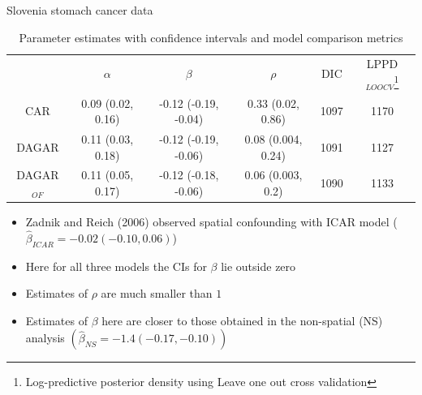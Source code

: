 \begin{frame}{Slovenia stomach cancer data}
	\begin{table}[!h]
		\begin{tiny}
			\caption{Parameter estimates with confidence intervals and model comparison metrics}\label{tab:slov}
			\begin{tabular}{cccccc}
				& $\alpha$ & $\beta$ & $\rho$ & DIC & LPPD$_{LOOCV}$\footnote{Log-predictive posterior density using Leave one out cross validation} \\
				CAR & 0.09 (0.02, 0.16) & -0.12 (-0.19, -0.04) & 0.33 (0.02, 0.86) & 1097 & 1170 \\
				DAGAR & 0.11 (0.03, 0.18) & -0.12 (-0.19, -0.06) & 0.08 (0.004, 0.24) & 1091 & 1127 \\
				DAGAR$_{OF}$ & 0.11 (0.05, 0.17) & -0.12 (-0.18, -0.06) & 0.06 (0.003, 0.2) & 1090 & 1133 \\
			\end{tabular}
		\end{tiny}
	\end{table}
	\begin{itemize}
		\item Zadnik and Reich (2006) observed \alert{spatial confounding} with ICAR model ($\hat\beta_{ICAR} = -0.02 (-0.10, 0.06)$)
		\item Here for all three models the CIs for $\beta$ lie outside zero 
		\item Estimates of $\rho$ are much smaller than $1$
		\item Estimates of $\beta$ here are closer to those obtained in the non-spatial (NS) analysis $(\hat\beta_{NS} = -1.4 (-0.17, -0.10))$
	\end{itemize}
\end{frame}

